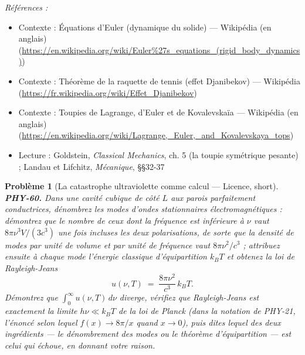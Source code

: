 \documentclass[11pt]{article}
\newtheorem{problem}{Problème}
\newenvironment{refs}{\par\small\noindent\emph{Références :}\begin{itemize}\setlength\itemsep{0pt}}{\end{itemize}\normalsize}
\begin{document}
\begin{refs}
\item Contexte : Équations d'Euler (dynamique du solide) --- Wikipédia (en anglais) (\url{https://en.wikipedia.org/wiki/Euler%27s_equations_(rigid_body_dynamics)})
\item Contexte : Théorème de la raquette de tennis (effet Djanibekov) --- Wikipédia (\url{https://fr.wikipedia.org/wiki/Effet_Djanibekov})
\item Contexte : Toupies de Lagrange, d'Euler et de Kovalevskaïa --- Wikipédia (en anglais) (\url{https://en.wikipedia.org/wiki/Lagrange,_Euler,_and_Kovalevskaya_tops})
\item Lecture : Goldstein, \textit{Classical Mechanics}, ch. 5 (la toupie symétrique pesante) ; Landau et Lifchitz, \textit{Mécanique}, \S{}\S{}32-37
\end{refs}

\bigskip

\begin{problem}[{La catastrophe ultraviolette comme calcul --- Licence, short}]
\textbf{PHY-60.} Dans une cavité cubique de côté $ L $ aux parois
parfaitement conductrices, dénombrez les modes d'ondes stationnaires électromagnétiques :
démontrez que le nombre de ceux dont la fréquence est inférieure à $ \nu $ vaut
$ 8\pi\nu^{3}V/(3c^{3}) $ une fois incluses les deux polarisations, de sorte que la densité de
modes par unité de volume et par unité de fréquence vaut $ 8\pi\nu^{2}/c^{3} $ ; attribuez
ensuite à chaque mode l'énergie classique d'équipartition $ k_{B}T $ et obtenez la loi de
Rayleigh-Jeans
\[ u(\nu,T) \;=\; \frac{8\pi\nu^{2}}{c^{3}}\,k_{B}T . \]
Démontrez que $ \int_{0}^{\infty} u(\nu,T)\,d\nu $ diverge, vérifiez que Rayleigh-Jeans est
exactement la limite $ h\nu \ll k_{B}T $ de la loi de Planck (dans la notation de PHY-21,
l'énoncé selon lequel $ f(x)\to 8\pi/x $ quand $ x\to 0 $), puis dites lequel des deux
ingrédients --- le dénombrement des modes ou le théorème d'équipartition --- est celui qui échoue, en
donnant votre raison.
\end{problem}
\end{document}
